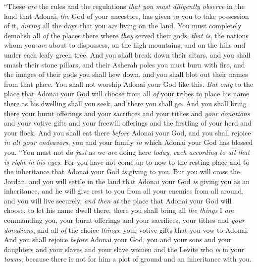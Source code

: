 \begin{biblechapter} %
 “These \textit{are} the rules and the regulations \textit{that you must diligently observe} in the land that Adonai, \textit{the} God of your ancestors, has given to you to take possession of it, \textit{during} all the days that you \textit{are} living on the land.
\verse You must completely demolish all \textit{of} the places there where \textit{they} served their gods, \textit{that is}, the nations whom you \textit{are} about to dispossess, on the high mountains, and on the hills and under each leafy green tree.
\verse And you shall break down their altars, and you shall smash their stone pillars, and their Asherah poles you must burn with fire, and the images of their gods you shall hew down, and you shall blot out their names from that place.
\verse You shall not worship Adonai your God like this.
\verse \textit{But only} to the place that Adonai your God will choose from all \textit{of} your tribes to place his name there as his dwelling shall you seek, and there you shall go.
\verse And you shall bring there your burnt offerings and your sacrifices and your tithes and \textit{your donations} and your votive gifts and your freewill offerings and the firstling of your herd and your flock.
\verse And you shall eat there \textit{before} Adonai your God, and you shall rejoice \textit{in all your endeavors}, you and your family \textit{in} which Adonai your God has blessed you.
\verse “You must not do \textit{just} as we \textit{are} doing here \textit{today}, \textit{each according to all that is right in his eyes}.
\verse For you have not come up to now to the resting place and to the inheritance that Adonai your God \textit{is} giving to you.
\verse But you will cross the Jordan, and you will settle in the land that Adonai your God \textit{is} giving you as an inheritance, and he will give rest to you from all your enemies from all around, and you will live securely,
\verse \textit{and then} \textit{at} the place that Adonai your God will choose, to let his name dwell there, there you shall bring all \textit{the things} I \textit{am} commanding you, your burnt offerings and your sacrifices, your tithes and \textit{your donations}, and all \textit{of} the choice \textit{things}, your votive gifts that you vow to Adonai.
\verse And you shall rejoice \textit{before} Adonai your God, you and your sons and your daughters and your slaves and your slave women and the Levite who \textit{is} in your \textit{towns}, because there is not for him a plot of ground and an inheritance with you.

\end{biblechapter}

